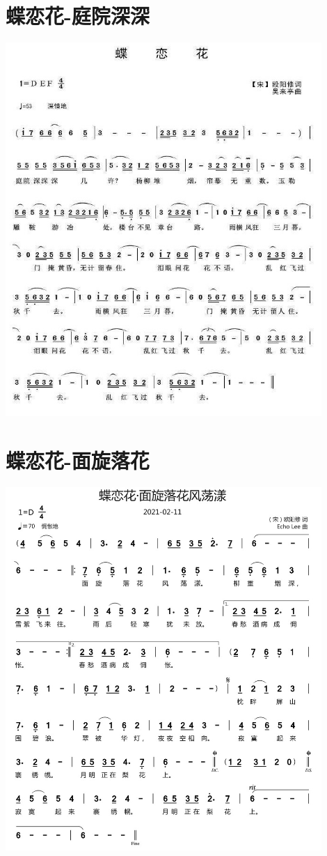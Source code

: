 \documentclass[cn,pad,twocol]{elegantbook}
\begin{document}
\section{蝶恋花-庭院深深} \includegraphics[width=0.9\textwidth]{rpi400/20210212欧阳修-蝶恋花庭院深深.jpg}
\section{蝶恋花-面旋落花} \includegraphics[width=0.9\textwidth]{rpi400/20210212欧阳修-蝶恋花面旋落花风荡漾.jpg}
\end{document}
